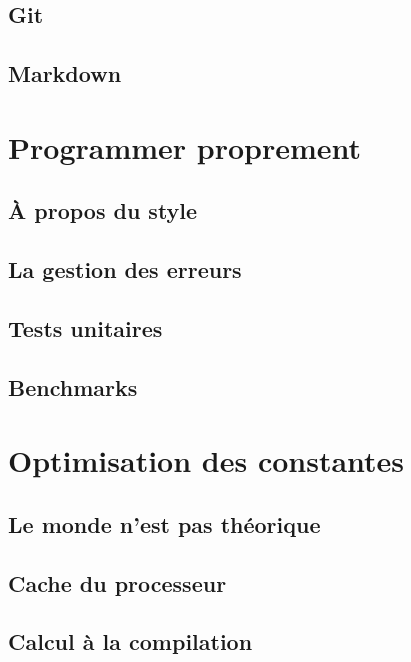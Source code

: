 \documentclass{minitelreport}
\begin{document}
\begin{refsection}
		\section{Git}
			\label{sec:git}
			
		\section{Markdown}
			\label{sec:le_markdown}
			
	\chapter{Programmer proprement}
	\label{chap:programmer_proprement}
		\section{À propos du style}
			\label{sec:_propos_du_style}
			
		\section{La gestion des erreurs}
			\label{sec:la_gestion_des_erreurs}
			
		\section{Tests unitaires}
			\label{sec:tests_unitaires}
			
		\section{Benchmarks}
			\label{sec:benchmarks}
			
	\chapter{Optimisation des constantes}
	\label{cha:optimisation_des_constantes}
		\section{Le monde n'est pas théorique}
		\section{Cache du processeur}
		\section{Calcul à la compilation}

\end{refsection}
\end{document}
